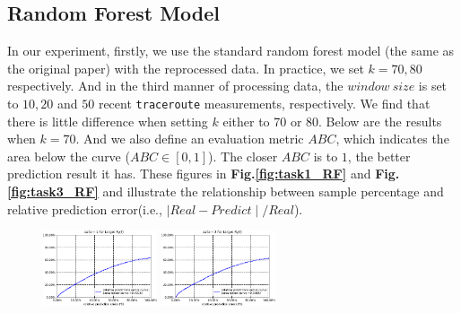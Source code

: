 \documentclass[sigconf]{acmart}
\begin{document}
	\subsection{Random Forest Model}
	In our experiment, firstly, we use the standard random forest model (the same as the original paper) with the reprocessed data.  In practice, we set $k = 70, 80$ respectively. And in the third manner of processing data, the $window\ size$ is set to $10,20$ and $50$ recent \texttt{traceroute} measurements, respectively. We find that there is little difference when setting $k$ either to 70 or 80. Below are the results when $k = 70$. And we also define an evaluation metric $ABC$, which indicates the  area below the curve ($ABC\in[0,1]$). The closer $ABC$ is to $1$, the better prediction result it has. These figures in \textbf{Fig.\ref{fig:task1_RF}} and \textbf{Fig.\ref{fig:task3_RF}} and  illustrate the relationship between sample percentage and relative prediction error(i.e., $\mid Real - Predict\mid/ Real $). 
	\begin{figure} [!htb] 
		\centering  
		\includegraphics[width=0.3\textwidth]{fig4/data-1-task-1-7030-RF.pdf}  
		\includegraphics[width=0.3\textwidth]{fig4/data-2-task-1-7030-RF.pdf} 
	\end{figure} 
\end{document}
